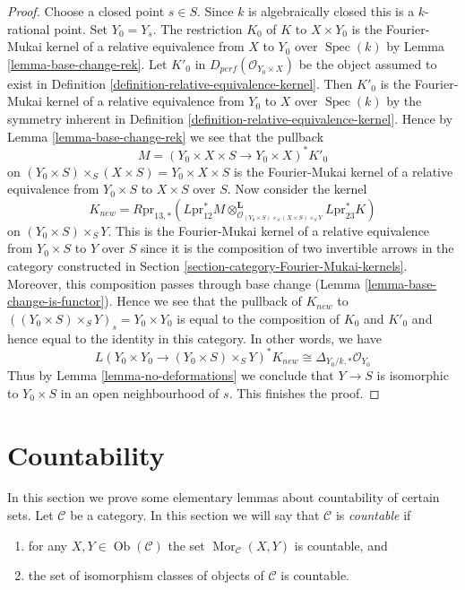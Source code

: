 \documentclass{stacks-project}
\theoremstyle{plain}
\theoremstyle{definition}
\theoremstyle{remark}
\numberwithin{equation}{subsection}
\def\Spec{\mathop{\mathrm{Spec}}}
\def\Mor{\mathop{\mathrm{Mor}}\nolimits}
\def\Ob{\mathop{\mathrm{Ob}}\nolimits}
\begin{document}
\begin{proof}
Choose a closed point $s \in S$. Since $k$ is algebraically closed
this is a $k$-rational point. Set $Y_0 = Y_s$. The restriction
$K_0$ of $K$ to $X \times Y_0$ is the Fourier-Mukai kernel of a
relative equivalence from $X$ to $Y_0$ over $\Spec(k)$ by
Lemma \ref{lemma-base-change-rek}. Let $K'_0$ in
$D_{perf}(\mathcal{O}_{Y_0 \times X})$ be the 
object assumed to
exist in Definition \ref{definition-relative-equivalence-kernel}.
Then $K'_0$ is the Fourier-Mukai kernel of a
relative equivalence from $Y_0$ to $X$ over $\Spec(k)$
by the symmetry inherent in
Definition \ref{definition-relative-equivalence-kernel}.
Hence by
Lemma \ref{lemma-base-change-rek}
we see that the pullback
$$
M = (Y_0 \times X \times S \to Y_0 \times X)^*K'_0
$$
on $(Y_0 \times S) \times_S (X \times S) = Y_0 \times X \times S$
is the Fourier-Mukai kernel of a
relative equivalence from $Y_0 \times S$ to $X \times S$ over $S$.
Now consider the kernel
$$
K_{new} =
R\text{pr}_{13, *}(L\text{pr}_{12}^*M
\otimes_{\mathcal{O}_{(Y_0 \times S) \times_S (X \times S)
\times_S Y}}^\mathbf{L}
L\text{pr}_{23}^*K)
$$
on $(Y_0 \times S) \times_S Y$. This is the Fourier-Mukai kernel of a
relative equivalence from $Y_0 \times S$ to $Y$ over $S$ since it is
the composition of two invertible arrows in
the category constructed in
Section \ref{section-category-Fourier-Mukai-kernels}.
Moreover, this composition passes through base change
(Lemma \ref{lemma-base-change-is-functor}).
Hence we see that the pullback of $K_{new}$ to
$((Y_0 \times S) \times_S Y)_s = Y_0 \times Y_0$
is equal to the composition of $K_0$ and $K'_0$
and hence equal to the identity in this category.
In other words, we have
$$
L(Y_0 \times Y_0 \to (Y_0 \times S) \times_S Y)^*K_{new}
\cong
\Delta_{Y_0/k, *}\mathcal{O}_{Y_0}
$$
Thus by Lemma \ref{lemma-no-deformations} we conclude that $Y \to S$
is isomorphic to $Y_0 \times S$ in an open neighbourhood of $s$.
This finishes the proof.
\end{proof}






\section{Countability}
\label{section-countability}

\noindent
In this section we prove some elementary lemmas about countability
of certain sets. Let $\mathcal{C}$ be a category. In this section
we will say that $\mathcal{C}$ is {\it countable} if
\begin{enumerate}
\item for any $X, Y \in \Ob(\mathcal{C})$ the set
$\Mor_\mathcal{C}(X, Y)$ is countable, and
\item the set of isomorphism classes of objects of $\mathcal{C}$
is countable.
\end{enumerate}
\end{document}
